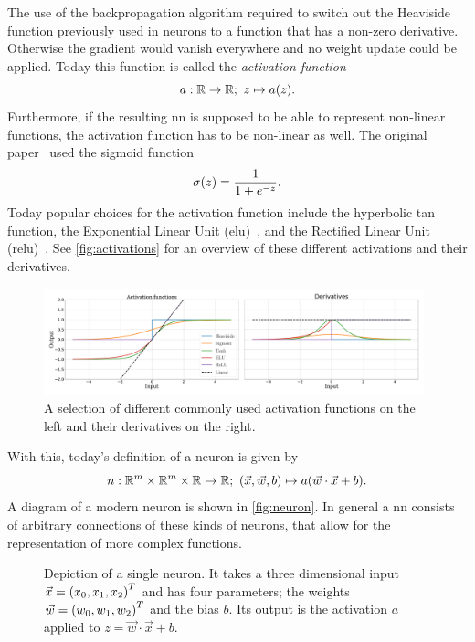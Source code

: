 The use of the backpropagation algorithm required to switch out the Heaviside function previously used in neurons to a function that has a non-zero derivative. Otherwise the gradient would vanish everywhere and no weight update could be applied. Today this function is called the \emph{activation function}
\begin{equation}
a: \R\to\R;\ z\mapsto a\lr{z}.
\end{equation}
Furthermore, if the resulting \acrshort{nn} is supposed to be able to represent non-linear functions, the activation function has to be non-linear as well. The original paper~\cite{rumelhart1985:aaa} used the sigmoid function
\begin{equation}\label{eq:def-sigmoid}
\sigma{\left( z \right)}=\frac{1}{1+e^{-z}}.
\end{equation}
Today popular choices for the activation function include the hyperbolic tan function, the Exponential Linear Unit (\acrshort{elu})~\cite{Clevert:2015aaa}, and the Rectified Linear Unit (\acrshort{relu})~\cite{Fukushima:1975aaa, Nair:2010aaa}. See \autoref{fig:activations} for an overview of these different activations and their derivatives.

\begin{figure}
	\centering
	\includegraphics[width=0.98\textwidth]{chapters/foundations/sections/ml/images/activations.pdf}
	\caption[Activation functions]{A selection of different commonly used activation functions on the left and their derivatives on the right.}\label{fig:activations}
\end{figure}

With this, today's definition of a neuron is given by
\begin{equation}\label{eq:def-neuron}
n: {\mathbb{R}}^m\times {\mathbb{R}}^m\times {\mathbb{R}} \to {\mathbb{R}};\ {\left( \vec{x}, \vec{w}, b \right)}\mapsto a{\left( \vec{w}\cdot\vec{x} + b \right)}.
\end{equation}
A diagram of a modern neuron is shown in \autoref{fig:neuron}. In general a \acrshort{nn} consists of arbitrary connections of these kinds of neurons, that allow for the representation of more complex functions.

\begin{figure}
	\centering
	
	\caption[Single artificial neuron]{Depiction of a single neuron. It takes a three dimensional input $\vec{x}={\left( x_0, x_1, x_2 \right)}^T$ and has four parameters; the weights $\vec{w}={\left( w_0, w_1, w_2 \right)}^T$ and the bias $b$. Its output is the activation $a$ applied to $z=\vec{w}\cdot \vec{x}+b$.}\label{fig:neuron}
\end{figure}

